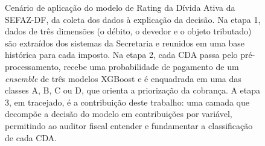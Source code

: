\begin{figure}[H]
    \caption[Cenário de aplicação do Rating da Dívida Ativa]{Cenário de aplicação do modelo de Rating da Dívida Ativa da SEFAZ-DF, da coleta dos dados à explicação da decisão. Na etapa 1, dados de três dimensões (o débito, o devedor e o objeto tributado) são extraídos dos sistemas da Secretaria e reunidos em uma base histórica para cada imposto. Na etapa 2, cada CDA passa pelo pré-processamento, recebe uma probabilidade de pagamento de um \textit{ensemble} de três modelos XGBoost e é enquadrada em uma das classes A, B, C ou D, que orienta a priorização da cobrança. A etapa 3, em tracejado, é a contribuição deste trabalho: uma camada que decompõe a decisão do modelo em contribuições por variável, permitindo ao auditor fiscal entender e fundamentar a classificação de cada CDA.}
    \label{fig:cenario_aplicacao}
\end{figure}
